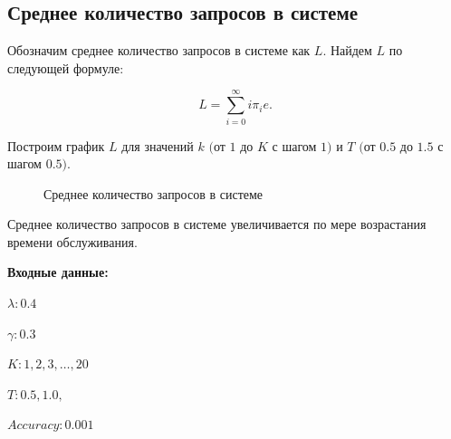 \documentclass[12pt, a4paper]{article}
\begin{document}
\subsection{Среднее количество запросов в системе}


Обозначим среднее количество запросов в системе как $L$. Найдем $L$ по следующей формуле:

$$L = \sum\limits_{i = 0}^{\infty} i \pi_i e.$$

Построим график $L$ для значений $k$ $($от $1$ до $K$ с шагом $1)$ и  $T$ $($от $0.5$ до $1.5$  с шагом $0.5)$.

\begin{figure}[h]
	\caption{Среднее количество запросов в системе}
	\label{ris2}
\end{figure}


Среднее количество запросов в системе увеличивается по мере возрастания времени обслуживания. \pagebreak

\textbf{Входные данные:}

$\lambda: 0.4$

$\gamma: 0.3$

$K: 1, 2, 3, \ldots, 20$

$T: 0.5, 1.0, $

$Accuracy: 0.001$
\end{document}

